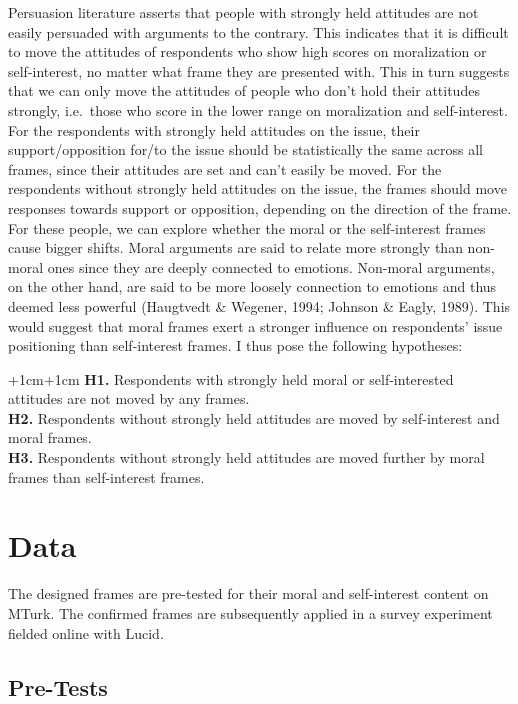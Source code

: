 \documentclass[12pt,econ]{sources/authesis}
\begin{document}
Persuasion literature asserts that people with strongly held attitudes are not easily persuaded with arguments to the contrary. This indicates that it is difficult to move the attitudes of respondents who show high scores on moralization or self-interest, no matter what frame they are presented with. This in turn suggests that we can only move the attitudes of people who don't hold their attitudes strongly, i.e.~those who score in the lower range on moralization and self-interest. For the respondents with strongly held attitudes on the issue, their support/opposition for/to the issue should be statistically the same across all frames, since their attitudes are set and can't easily be moved. For the respondents without strongly held attitudes on the issue, the frames should move responses towards support or opposition, depending on the direction of the frame. For these people, we can explore whether the moral or the self-interest frames cause bigger shifts. Moral arguments are said to relate more strongly than non-moral ones since they are deeply connected to emotions. Non-moral arguments, on the other hand, are said to be more loosely connection to emotions and thus deemed less powerful (Haugtvedt \& Wegener, 1994; Johnson \& Eagly, 1989). This would suggest that moral frames exert a stronger influence on respondents' issue positioning than self-interest frames. I thus pose the following hypotheses:

\vspace{0.3cm}
\begin{adjustwidth*}{+1cm}{+1cm}
\noindent \textbf{H1.} Respondents with strongly held moral or self-interested attitudes are not moved by any frames.\\
\textbf{H2.} Respondents without strongly held attitudes are moved by self-interest and moral frames.\\
\textbf{H3.} Respondents without strongly held attitudes are moved further by moral frames than self-interest frames.
\end{adjustwidth*}
\hypertarget{framing-data}{%
\section{Data}\label{framing-data}}

The designed frames are pre-tested for their moral and self-interest content on MTurk. The confirmed frames are subsequently applied in a survey experiment fielded online with Lucid.

\hypertarget{framing-data-pre_test}{%
\subsection{Pre-Tests}\label{framing-data-pre_test}}
\end{document}
